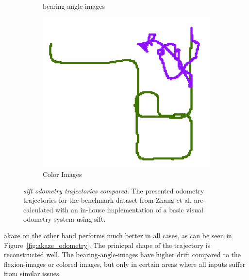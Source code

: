 \begin{figure}[t]
\begin{subfigure}[b]{0.31\linewidth}
    \caption{\glspl{bearing-angle-image}}
\end{subfigure}%
\begin{subfigure}[b]{0.31\linewidth}
    \includegraphics[width=0.8\linewidth]{chapter06/odo/zhang_pinhole_SIFT_nice.png}%
    \caption{Color Images}
\end{subfigure}
\caption[\acrshort{sift} odometry trajectories compared]{\emph{\acrshort{sift} odometry trajectories compared.} The presented odometry trajectories for the benchmark dataset from Zhang et al.\cite{zhang_icra2016} are calculated with an in-house implementation of a basic visual odometry system using \acrshort{sift}.}\label{fig:sift_odometry}
\end{figure}
\acrshort{akaze} on the other hand performs much better in all cases, as can be seen in Figure~\ref{fig:akaze_odometry}.
The prinicpal shape of the trajectory is reconstructed well.
The \glspl{bearing-angle-image} have higher drift compared to the \glspl{flexion-image} or colored images, but only in certain areas where all inputs suffer from similar issues.
